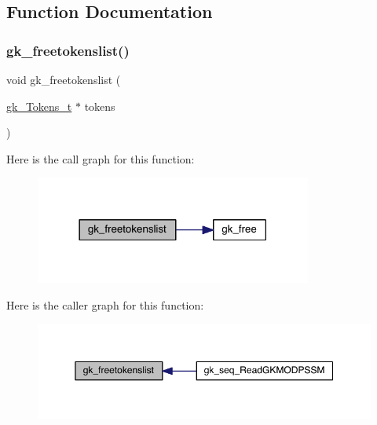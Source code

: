 \subsection{Function Documentation}
\mbox{\label{a00161_a721067a5b35f35422d141ad8652021ec}} 
\subsubsection{\texorpdfstring{gk\+\_\+freetokenslist()}{gk\_freetokenslist()}}
{\footnotesize\ttfamily void gk\+\_\+freetokenslist (\begin{DoxyParamCaption}\item[{\hyperlink{a00654}{gk\+\_\+\+Tokens\+\_\+t} $\ast$}]{tokens }\end{DoxyParamCaption})}

Here is the call graph for this function\+:\nopagebreak
\begin{figure}[H]
\begin{center}
\leavevmode
\includegraphics[width=258pt]{a00161_a721067a5b35f35422d141ad8652021ec_cgraph}
\end{center}
\end{figure}
Here is the caller graph for this function\+:\nopagebreak
\begin{figure}[H]
\begin{center}
\leavevmode
\includegraphics[width=350pt]{a00161_a721067a5b35f35422d141ad8652021ec_icgraph}
\end{center}
\end{figure}
\mbox{\label{a00161_a551670b0d23e97d4655a827762c6bacd}} 

